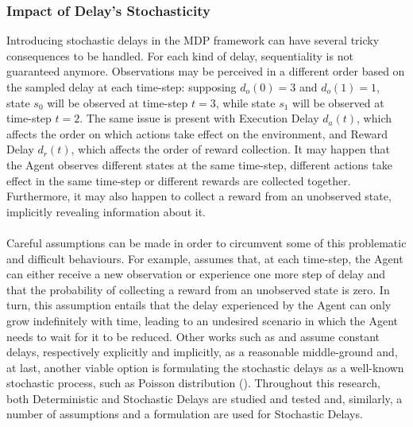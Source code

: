             
            \subsubsection{Impact of Delay's Stochasticity}
            Introducing stochastic delays in the MDP framework can have several tricky consequences to be handled. For each kind of delay, sequentiality is not guaranteed anymore. Observations may be perceived in a different order based on the sampled delay at each time-step: supposing $d_o(0) = 3$ and $d_o(1) = 1$, state $s_0$ will be observed at time-step $t=3$, while state $s_1$ will be observed at time-step $t=2$. The same issue is present with Execution Delay $d_a(t)$, which affects the order on which actions take effect on the environment, and Reward Delay $d_r(t)$, which affects the order of reward collection. It may happen that the Agent observes different states at the same time-step, different actions take effect in the same time-step or different rewards are collected together. Furthermore, it may also happen to collect a reward from an unobserved state, implicitly revealing information about it. \\\\
            Careful assumptions can be made in order to circumvent some of this problematic and difficult behaviours. For example,  assumes that, at each time-step, the Agent can either receive a new observation or experience one more step of delay and that the probability of collecting a reward from an unobserved state is zero. In turn, this assumption entails that the delay experienced by the Agent can only grow indefinitely with time, leading to an undesired scenario in which the Agent needs to wait for it to be reduced. Other works such as  and  assume constant delays, respectively explicitly and implicitly, as a reasonable middle-ground and, at last, another viable option is formulating the stochastic delays as a well-known stochastic process, such as Poisson distribution (). \newline
            Throughout this research, both Deterministic and Stochastic Delays are studied and tested and, similarly, a number of assumptions and a formulation are used for Stochastic Delays.
        
